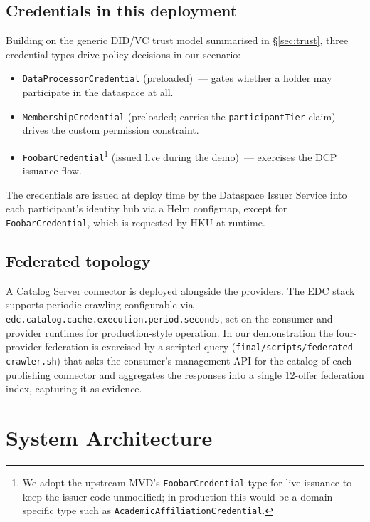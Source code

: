 \documentclass[11pt,a4paper]{article}
\DeclareRobustCommand{\code}[1]{\texttt{\small #1}}
\begin{document}
\subsection{Credentials in this deployment}

Building on the generic DID/VC trust model summarised in §\ref{sec:trust},
three credential types drive policy decisions in our scenario:

\begin{itemize}
  \item \code{DataProcessorCredential} (preloaded)~--- gates whether a
    holder may participate in the dataspace at all.
  \item \code{MembershipCredential} (preloaded; carries the
    \code{participantTier} claim)~--- drives the custom permission
    constraint.
  \item \code{FoobarCredential}\footnote{We adopt the upstream MVD's
    \code{FoobarCredential} type for live issuance to keep the issuer
    code unmodified; in production this would be a domain-specific type
    such as \code{AcademicAffiliationCredential}.} (issued live during
    the demo)~--- exercises the DCP issuance flow.
\end{itemize}

The credentials are issued at deploy time by the Dataspace Issuer Service
into each participant's identity hub via a Helm configmap, except for
\code{FoobarCredential}, which is requested by HKU at runtime.

\subsection{Federated topology}

A Catalog Server connector is deployed alongside the providers. The
EDC stack supports periodic crawling configurable via
\code{edc.catalog.cache.execution.period.seconds}, set on the
consumer and provider runtimes for production-style operation. In our
demonstration the four-provider federation is exercised by a scripted
query (\code{final/scripts/federated-crawler.sh}) that asks the
consumer's management API for the catalog of each publishing
connector and aggregates the responses into a single 12-offer
federation index, capturing it as evidence.

\section{System Architecture}
\label{sec:arch}
\end{document}
